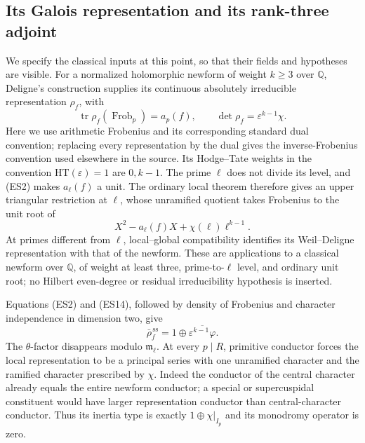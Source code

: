 \subsection{Its Galois representation and its rank-three adjoint}
We specify the classical inputs at this point, so that their
fields and hypotheses are visible.
For a normalized holomorphic newform of weight \(k\ge3\)
over \(\mathbb Q\), Deligne's construction supplies its
continuous absolutely irreducible representation \(\rho_f\),
with
\[
 \operatorname{tr}\rho_f(\operatorname{Frob}_p)=a_p(f),
 \qquad
 \det\rho_f=\varepsilon^{k-1}\chi .
 \tag{ES14}
\]
Here we use arithmetic Frobenius and its corresponding
standard dual convention; replacing every representation
by the dual gives the inverse-Frobenius convention used
elsewhere in the source.
Its Hodge--Tate weights in the convention
\(\mathrm{HT}(\varepsilon)=1\) are \(0,k-1\).
The prime \(\ell\) does not divide its level, and (ES2)
makes \(a_\ell(f)\) a unit.
The ordinary local theorem therefore gives an upper
triangular restriction at \(\ell\), whose unramified
quotient takes Frobenius to the unit root of
\[
                    X^2-a_\ell(f)X+\chi(\ell)\ell^{k-1}.
\]
At primes different from \(\ell\), local--global compatibility
identifies its Weil--Deligne representation with that of
the newform.
These are applications to a classical newform over
\(\mathbb Q\), of weight at least three, prime-to-\(\ell\)
level, and ordinary unit root; no Hilbert even-degree or
residual irreducibility hypothesis is inserted.

Equations (ES2) and (ES14), followed by density of Frobenius
and character independence in dimension two, give
\[
                  \bar\rho_f^{\,\mathrm{ss}}
                        =1\oplus\overline{\varepsilon^{k-1}
                                                      \varphi}.
 \tag{ES15}
\]
The \(\theta\)-factor disappears modulo
\(\mathfrak m_\ell\).
At every \(p\mid R\), primitive conductor forces the local
representation to be a principal series with one
unramified character and the ramified character prescribed
by \(\chi\).
Indeed the conductor of the central character already
equals the entire newform conductor; a special or
supercuspidal constituent would have larger representation
conductor than central-character conductor.
Thus its inertia type is exactly \(1\oplus\chi|_{I_p}\)
and its monodromy operator is zero.

